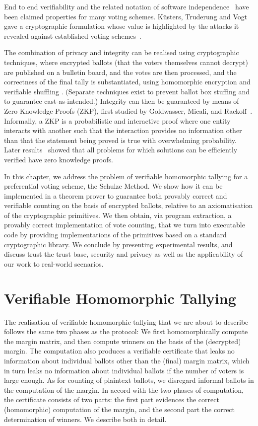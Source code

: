 End to end verifiability and the related notation of software independence~\cite{Rivest:2008:PTRS}
 have been claimed properties for many voting schemes.
 K{\"u}sters, Truderung and Vogt~\cite{Kusters:2010:CCS} 
 gave
 a cryptographic formulation whose value is highlighted by the attacks it revealed against established voting 
 schemes~\cite{Kusters:2012:SP}.

The combination of privacy and integrity can be realised using cryptographic techniques, where
encrypted ballots (that the voters themselves cannot decrypt) are
published on a bulletin board, and the votes are then processed, and
the correctness of the final tally is substantiated, using
homomorphic encryption \cite{Hirt:2000:ERF} and verifiable shuffling
\cite{Bayer:2012:EZK}. (Separate techniques exist to prevent ballot
box stuffing and to guarantee cast-as-intended.)
Integrity can then be guaranteed by means of Zero Knowledge Proofs
(ZKP),
first studied by Goldwasser, Micali, and Rackoff~\cite{Goldwasser:1985:STOC}.
Informally, a ZKP is a probabilistic and interactive proof where one
entity interacts with another such that the interaction provides
no information other than that the statement being proved is true with
overwhelming probability. 
Later results~\cite{Ben-Or:1988:CRYPTO,Goldreich:1991:ACM}
showed that 
all problems for which solutions can be efficiently verified have zero knowledge
proofs.


In this chapter, we address the problem of verifiable homomorphic tallying
for a preferential voting scheme, the Schulze Method. We show
how it can be implemented in a theorem prover to
guarantee both provably correct and verifiable counting on the basis
of encrypted ballots, relative to an axiomatisation of the
cryptographic primitives. We then obtain, via program extraction, a
provably correct implementation of vote counting, that we turn
into executable code by providing implementations of the primitives
based on a standard cryptographic library. We conclude by presenting
experimental results, and discuss trust the trust base, security and
privacy as well as the applicability of our work to real-world
scenarios. 

\section{Verifiable Homomorphic Tallying}
The realisation of verifiable homomorphic tallying that we are about to
describe follows the same two phases as the protocol: We first
homomorphically compute the margin matrix, and then compute
winners on the basis of the (decrypted) margin. The computation also
produces a verifiable certificate that leaks no information about
individual ballots other than the (final) margin matrix, which in
turn leaks no information about individual ballots if the number of
voters is large enough. As for counting of plaintext ballots, we
disregard informal ballots in the computation of the margin.
In accord with the two phases of computation, the certificate
consists of two parts: the first part evidences the correct
(homomorphic) computation of the margin, and the second part the
correct determination of winners. We describe both in detail.


